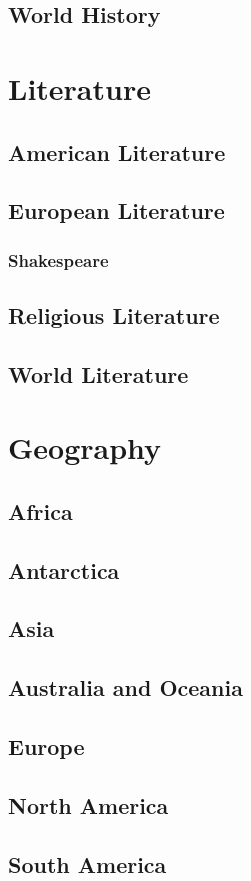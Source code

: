 \documentclass{book}
\begin{document}
	\section{World History}
\chapter{Literature}
	\section{American Literature}
	\section{European Literature}
		\subsection{Shakespeare}
	\section{Religious Literature}
	\section{World Literature}
\chapter{Geography}
	\section{Africa}
	\section{Antarctica}
	\section{Asia}
	\section{Australia and Oceania}
	\section{Europe}
	\section{North America}
	\section{South America}
\end{document}
